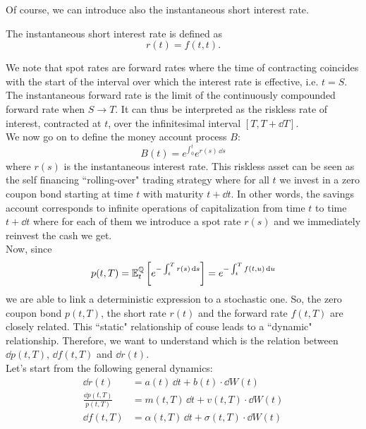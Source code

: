 Of course, we can introduce also the instantaneous short interest rate.
\begin{definition}
    The instantaneous short interest rate is defined as
    \begin{equation}
        r(t) = f(t,t).
    \end{equation}
\end{definition}
We note that spot rates are forward rates where the time of contracting coincides with the start of the interval over which the interest rate is effective, i.e. $t = S$. The instantaneous forward rate is the limit of the continuously compounded forward rate when $S \to T$. It can thus be interpreted as the riskless rate of interest, contracted at $t$, over the infinitesimal interval $[T,T +\dd T]$.\\
We now go on to define the money account process $B$:
\begin{equation}
    B(t) = e^{\int_0^t} e^{r(s)\,\dd s}
\end{equation}
where $r(s)$ is the instantaneous interest rate. This riskless asset can be seen as the self financing ``rolling-over" trading strategy where for all $t$ we invest in a zero coupon bond starting at time $t$ with maturity $t+\dd t$. In other words, the savings account corresponds to infinite operations of capitalization from time $t$ to time $t+\dd t$ where for each of them we introduce a spot rate $r(s)$ and we immediately reinvest the cash we get. \\
Now, since
\begin{equation}
    p(t,T) = \mathbb{E}^{\mathbb{Q}}_t\left[e^{-\int_t^T r(s)\,\dd s}\right] = e^{-\int_t^T f(t,u)\,\dd u}
\end{equation}
we are able to link a deterministic expression to a stochastic one. So, the zero coupon bond $p(t,T)$, the short rate $r(t)$ and the forward rate $f(t,T)$ are closely related. This ``static" relationship of couse leads to a ``dynamic" relationship. Therefore, we want to understand which is the relation between $\dd p(t,T)$, $\dd f(t,T)$ and $\dd r(t)$.\\
Let's start from the following general dynamics:
\begin{align}
    \dd r(t) &= a(t)\,\dd t + b(t)\cdot \dd W(t) \\
    \frac{\dd p(t,T)}{p(t,T)} &= m(t,T)\,\dd t + v(t,T)\cdot \dd W(t) \label{zcbdyn} \\
    \dd f(t,T) &= \alpha(t,T)\,\dd t + \sigma(t,T)\cdot \dd W(t) \label{forwratedyn}
\end{align}
